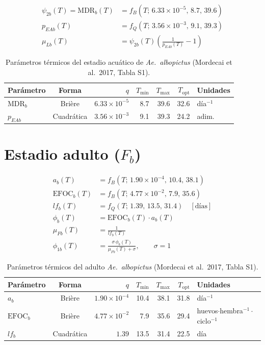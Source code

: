 \documentclass[11pt,a4paper]{article}
\begin{document}
\begin{align*}
\psi_{2b}(T) = \mathrm{MDR}_b(T) &= f_B(T;\,6.33\!\times\!10^{-5},\,8.7,\,39.6) \\
p_{EAb}(T) &= f_Q(T;\,3.56\!\times\!10^{-3},\,9.1,\,39.3) \\
\mu_{Lb}(T) &= \psi_{2b}(T)\left(\frac{1}{p_{EAb}(T)} - 1\right)
\end{align*}

\begin{table}[h!]
\centering
\caption{Par\'ametros t\'ermicos del estadio acu\'atico de \textit{Ae.\ albopictus} (Mordecai et al.\ 2017, Tabla S1).}
\begin{tabular}{lcrrrrl}
\toprule
Par\'ametro & Forma & $q$ & $T_{\min}$ & $T_{\max}$ & $T_{\mathrm{opt}}$ & Unidades \\
\midrule
$\mathrm{MDR}_b$ & Bri\`ere     & $6.33\!\times\!10^{-5}$ & 8.7 & 39.6 & 32.6 & d\'ia$^{-1}$ \\
$p_{EAb}$        & Cuadr\'atica & $3.56\!\times\!10^{-3}$ & 9.1 & 39.3 & 24.2 & adim. \\
\bottomrule
\end{tabular}
\end{table}

\section{Estadio adulto (\texorpdfstring{$F_b$}{Fb})}

\begin{align*}
a_b(T) &= f_B(T;\,1.90\!\times\!10^{-4},\,10.4,\,38.1) \\
\mathrm{EFOC}_b(T) &= f_B(T;\,4.77\!\times\!10^{-2},\,7.9,\,35.6) \\
lf_b(T) &= f_Q(T;\,1.39,\,13.5,\,31.4) \quad [\text{d\'ias}] \\
\phi_b(T) &= \mathrm{EFOC}_b(T)\cdot a_b(T) \\
\mu_{Fb}(T) &= \frac{1}{lf_b(T)} \\
\phi_{1b}(T) &= \frac{\sigma\,\phi_b(T)}{\mu_{Fb}(T) + \sigma}, \qquad \sigma = 1
\end{align*}

\begin{table}[h!]
\centering
\caption{Par\'ametros t\'ermicos del adulto \textit{Ae.\ albopictus} (Mordecai et al.\ 2017, Tabla S1).}
\begin{tabular}{lcrrrrl}
\toprule
Par\'ametro & Forma & $q$ & $T_{\min}$ & $T_{\max}$ & $T_{\mathrm{opt}}$ & Unidades \\
\midrule
$a_b$            & Bri\`ere     & $1.90\!\times\!10^{-4}$ & 10.4 & 38.1 & 31.8 & d\'ia$^{-1}$ \\
$\mathrm{EFOC}_b$ & Bri\`ere    & $4.77\!\times\!10^{-2}$ & 7.9  & 35.6 & 29.4 & huevos$\cdot$hembra$^{-1}\cdot$ciclo$^{-1}$ \\
$lf_b$           & Cuadr\'atica & $1.39$                  & 13.5 & 31.4 & 22.5 & d\'ia \\
\bottomrule
\end{tabular}
\end{table}
\end{document}
